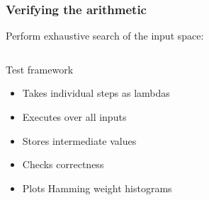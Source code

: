 \documentclass[11pt,t,usepdftitle=false,aspectratio=169]{beamer}
\begin{document}
\begin{frame}
  \frametitle{Verifying the arithmetic}
  Perform exhaustive search of the input space:
  \begin{columns}[T]
    \begin{column}{0.48\textwidth}
      \begin{block}{Test framework}
        \begin{itemize}
        \item Takes individual steps as lambdas
        \item Executes over all inputs
        \item Stores intermediate values
        \item \textcolor<2>{uibkorange}{Checks correctness}
        \item \textcolor<3>{uibkorange}{Plots Hamming weight histograms}
        \end{itemize}        
      \end{block}
    \end{column}
    \hfill
  \end{columns}
\end{frame}

\end{document}
